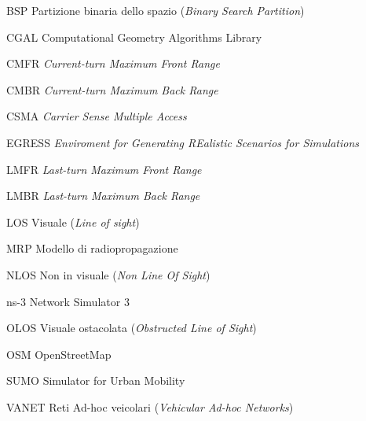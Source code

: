 \begin{abbreviations}

\item[BSP] Partizione binaria dello spazio (\textit{Binary Search Partition})
\item[CGAL] Computational Geometry Algorithms Library
\item[CMFR] \textit{Current-turn Maximum Front Range}
\item[CMBR] \textit{Current-turn Maximum Back Range}
\item[CSMA] \textit{Carrier Sense Multiple Access}
\item[EGRESS] \textit{Enviroment for Generating REalistic Scenarios for Simulations}
\item[LMFR] \textit{Last-turn Maximum Front Range}
\item[LMBR] \textit{Last-turn Maximum Back Range}
\item[LOS] Visuale (\textit{Line of sight})
\item[MRP] Modello di radiopropagazione
\item[NLOS] Non in visuale (\textit{Non Line Of Sight})
\item[ns-3] Network Simulator 3
\item[OLOS] Visuale ostacolata (\textit{Obstructed Line of Sight})
\item[OSM] OpenStreetMap
\item[SUMO] Simulator for Urban Mobility
\item[VANET] Reti Ad-hoc veicolari (\textit{Vehicular Ad-hoc Networks})

\end{abbreviations}
